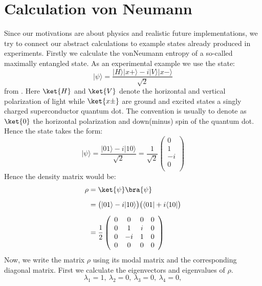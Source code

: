 \section{Calculation von Neumann}
Since our motivations are about physics and realistic 
future implementations, we try to connect our abstract calculations to 
example states already produced in experiments. Firstly we calculate the vonNeumann entropy of a so-called maximally entangled state. As an experimental example we use the state:
\begin{equation}
|\psi\rangle=\frac{|H\rangle|x+\rangle-i|V\rangle|x-\rangle}{\sqrt{2}}
\label{psivon}
\end{equation}
from \cite{PhysRevLett.110.167401}. Here $\ket{H}$ and $\ket{V}$ denote the
horizontal and vertical polarization of light while $\ket{x\pm}$ are ground and excited states a singly charged superconductor quantum dot. The convention is usually to denote as $\ket{0}$ the horizontal polarization and down(minus) spin of the quantum dot. Hence the state takes the form:
\begin{equation}
|\psi\rangle=\frac{|01\rangle-i|10\rangle}{\sqrt{2}}=\frac{1}{\sqrt{2}}\left(
\begin{array}{c}
 0 \\
 1\\
 -i\\
 0 \\
\end{array}
\right)
\end{equation}
Hence the density matrix would be:
\begin{align}
\rho &= \ket{\psi} \bra{\psi} \nonumber \\[0.5em]
&=\big{(}|01\rangle-i|10\rangle\big{)}\big{(}\langle01|+i\langle10|\big{)}\\[0.5em]
&=\frac{1}{2}\left(
\begin{array}{cccc}
 0 & 0 & 0 & 0 \\
 0 & 1 & i & 0 \\
 0 & -i & 1 & 0 \\
 0 & 0 & 0 & 0 \\
\end{array}
\right)\nonumber
\end{align}
Now, we write the matrix $\rho$ using its modal matrix and the corresponding diagonal matrix. 
First we calculate the eigenvectors and eigenvalues  of $\rho$.
\begin{equation}
\lambda_1=1,\:  \lambda_2=0,\:  \lambda_3=0,\:  \lambda_4=0, 
\end{equation}

